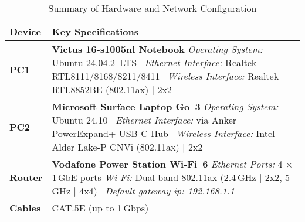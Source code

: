         \begin{table}[ht]
            \small
            \centering
            \begin{tabular}{@{}l p{}@{}}
            \toprule
            \textbf{Device} & \textbf{Key Specifications} \\
            \midrule
            \textbf{PC1} 
                & \textbf{Victus 16-s1005nl Notebook} \newline
                \textit{Operating System:}   Ubuntu 24.04.2~LTS~\cite{ubuntu} \newline
                \textit{Ethernet Interface:} Realtek RTL8111/8168/8211/8411~\cite{realtek8111} \newline
                \textit{Wireless Interface:} Realtek RTL8852BE (802.11ax) | 2x2~\cite{realtek8852be} \\
            \midrule
            \textbf{PC2} 
                & \textbf{Microsoft Surface Laptop Go~3} \newline
                \textit{Operating System:}   Ubuntu 24.10~\cite{ubuntu} \newline
                \textit{Ethernet Interface:} via Anker PowerExpand+ USB-C Hub~\cite{ankerhub} \newline
                \textit{Wireless Interface:} Intel Alder Lake-P CNVi (802.11ax) | 2x2~\cite{intelcnvi} \\
            \midrule
            \textbf{Router} 
                & \textbf{Vodafone Power Station Wi-Fi~6} \newline
                \textit{Ethernet Ports:}     4 $\times$ 1\,GbE ports \newline
                \textit{Wi-Fi:}              Dual-band 802.11ax (2.4\,GHz | 2x2, 5\,GHz | 4x4)~\cite{vodafonewifi6} \newline
                \textit{Default gateway ip: 192.168.1.1} \\
            \midrule
            \textbf{Cables} 
                & CAT.5E (up to 1\,Gbps) \\
            \bottomrule
            \end{tabular}
            \vspace{0.5cm}
            \caption{Summary of Hardware and Network Configuration}
            \label{tab:equipment-summary}
        \end{table}

        \vspace{-0.6cm} %

